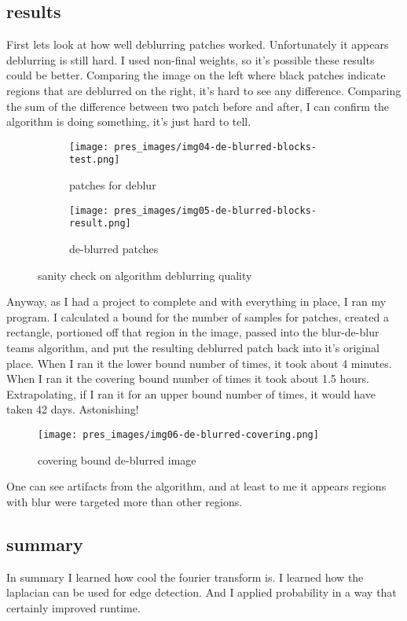 \documentclass[11pt]{article}
\begin{document}
\subsection*{results}

First lets look at how well deblurring patches worked. Unfortunately it appears deblurring
is still hard. I used non-final weights, so it's possible these results could be better.
Comparing the image on the left where black patches indicate regions that are deblurred
on the right, it's hard to see any difference. Comparing the sum of the difference
between two patch before and after, I can confirm the algorithm is doing something, it's
just hard to tell.

\begin{figure}[!ht]
  \centering
  \begin{subfigure}[b]{0.45\textwidth}
    \centering
    \texttt{[image: pres\_images/img04-de-blurred-blocks-test.png]}
    \caption{patches for deblur}
  \end{subfigure}
  \hfill
  \begin{subfigure}[b]{0.45\textwidth}
    \centering
    \texttt{[image: pres\_images/img05-de-blurred-blocks-result.png]}
    \caption{de-blurred patches}
  \end{subfigure}
  
  \caption{sanity check on algorithm deblurring quality}
  \label{fig:2}
\end{figure}

Anyway, as I had a project to complete and with everything in place, I ran my program.
I calculated a bound for the number of samples for patches, created a rectangle, portioned
off that region in the image, passed into the blur-de-blur teams algorithm, and put the
resulting deblurred patch back into it's original place. When I ran it the lower bound
number of times, it took about 4 minutes. When I ran it the covering bound number of
times it took about 1.5 hours. Extrapolating, if I ran it for an upper bound number of
times, it would have taken 42 days. Astonishing!


\begin{figure}[!ht]
  \centering
  \texttt{[image: pres\_images/img06-de-blurred-covering.png]}
  \caption{covering bound de-blurred image}
  \label{fig:3}
\end{figure}

One can see artifacts from the algorithm, and at least to me it appears regions with blur
were targeted more than other regions.

\subsection*{summary}

In summary I learned how cool the fourier transform is. I learned how the laplacian can
be used for edge detection. And I applied probability in a way that certainly improved
runtime.


\clearpage

\end{document}

